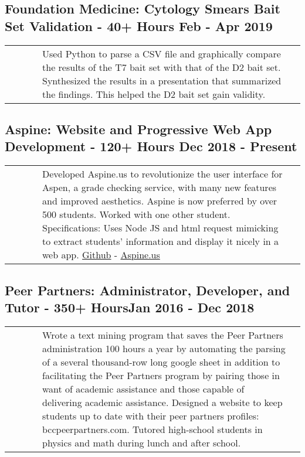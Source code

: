\documentclass{article}
\begin{document}
\subsection{Foundation Medicine: Cytology Smears Bait Set Validation - 40+ Hours \hfill Feb - Apr 2019\newline}

\begin{tabularx}{\linewidth}{ @{} l X r @{} }
\ \ \ \ \ & Used Python to parse a CSV file and graphically compare the results of the T7 bait set with that of the D2 bait set. Synthesized the results in a presentation that summarized the findings. This helped the D2 bait set gain validity.&
\end{tabularx}

\subsection{Aspine: Website and Progressive Web App Development - 120+ Hours \hfill Dec 2018 - Present\newline}

\begin{tabularx}{\linewidth}{ @{} l X r @{} }
\ \ \ \ \ & Developed Aspine.us to revolutionize the user interface for Aspen, a grade checking service, with many new features and improved aesthetics. Aspine is now preferred by over 500 students. Worked with one other student. Specifications: Uses Node JS and html request mimicking to extract students’ information and display it nicely in a web app. \href{https://github.com/maxtkc/aspine}{Github} - \href{https://aspine.us}{Aspine.us}
\end{tabularx}

\subsection{Peer Partners: Administrator, Developer, and Tutor - 350+ Hours\hfill Jan 2016 - Dec 2018\newline}

\begin{tabularx}{\linewidth}{ @{} l X r @{} }
\ \ \ \ \ & Wrote a text mining program that saves the Peer Partners administration 100 hours a year by automating the parsing of a several thousand-row long google sheet in addition to facilitating the Peer Partners program by pairing those in want of academic assistance and those capable of delivering academic assistance. Designed a website to keep students up to date with their peer partners profiles: bccpeerpartners.com. Tutored high-school students in physics and math during lunch and after school.
\end{tabularx}
\end{document}

